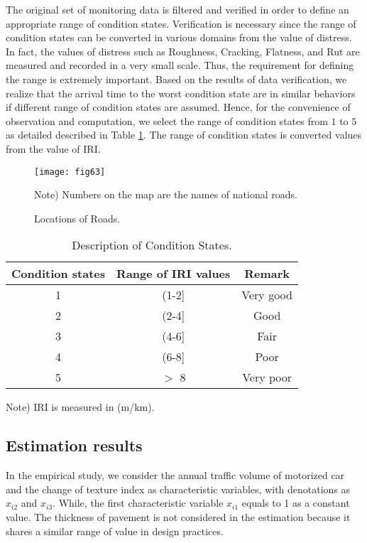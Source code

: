 The original set of monitoring data is filtered and verified in order to define an appropriate range of condition states. Verification 
is necessary since the range of condition states can be converted in various domains from the value of distress. In fact, the values of distress such as Roughness, Cracking, Flatness, and Rut are measured and recorded in a very small scale. Thus, the requirement for defining the range is extremely important. Based on the results of data verification, we realize that the arrival time to the worst condition state are in similar behaviors if different range of condition states are assumed. Hence, for the convenience of observation and computation, we select the range of condition states from $1$ to $5$ as detailed described in Table \ref{table61}. The range of condition states is converted values from the value of IRI.  

\begin{figure}[t]
\begin{center}
\texttt{[image: fig63]}
\end{center}
\footnotesize Note)  Numbers on the map are the names of national roads.
\caption{Locations of Roads.}
\label{fig63}
\end{figure}

\begin{table}[t]
\caption{Description of Condition States.}
\label{table61}
{\small
\begin{center}
\begin{tabular}{c|c|c}\hline
Condition states & Range of IRI values & Remark\\\hline
1 & (1-2] & Very good\\
2 & (2-4] & Good \\
3 & (4-6] & Fair \\
4 & (6-8] & Poor \\
5 & $>$ 8 & Very poor \\\hline
\end{tabular}
\end{center}
}
\footnotesize Note) IRI is measured in (m/km).
\end{table}%
\subsection{Estimation results}
\label{662}

In the empirical study, we consider the annual traffic volume of motorized car and the change of texture index as characteristic variables, with denotations as $x_{i2}$ and $x_{i3}$. While, the first characteristic variable $x_{i1}$ equals to 1 as a constant value. The thickness of pavement is not considered in the estimation because it shares a similar range of value in design practices.


